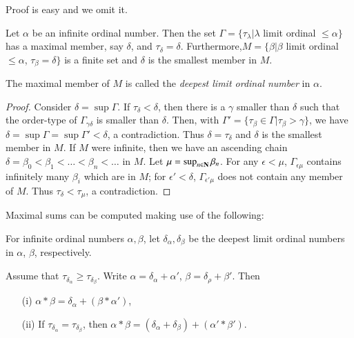 Proof is easy and we omit it.

\begin{thm}\label{art16-thm3.3}
Let $\alpha$ be an infinite ordinal number. Then the set $\Gamma =\{\tau_\lambda |\lambda$ limit ordinal $\leqslant \alpha\}$ has a maximal member, say $\delta$, and $\tau_\delta = \delta$. Furthermore,\pageoriginale $M = \{\beta | \beta$ limit ordinal $\leqslant \alpha$, $\tau_\beta = \delta\}$ is a finite set and $\delta$ is the smallest member in $M$.
\end{thm}

The maximal member of $M$ is called the {\em deepest limit ordinal number} in $\alpha$.

\begin{proof}
Consider $\delta = \sup \Gamma$. If $\tau_\delta < \delta$, then there is a $\gamma$ smaller than $\delta$ such that the order-type of $\Gamma_{\gamma\delta}$ is smaller than $\delta$. Then, with $\Gamma' = \{\tau_\beta \in \Gamma | \tau_\beta > \gamma\}$, we have $\delta = \sup \Gamma = \sup \Gamma' < \delta$, a contradiction. Thus $\delta = \tau_\delta$ and $\delta$ is the smallest member in $M$. If $M$ were infinite, then we have an ascending chain $\delta = \beta_0 < \beta_1 < \ldots < \beta_n < \ldots$ in $M$. Let  $\mu =\sup_{n \in \mathbf{N}} \beta_n$. For any $\epsilon < \mu$, $\Gamma_{\epsilon \mu}$ contains infinitely many $\beta_{i}$ which are in $M$; for $\epsilon' < \delta$, $\Gamma_{\epsilon'\mu}$ does not contain any member of $M$. Thus $\tau_\delta < \tau_\mu$, a contradiction.
\end{proof}

Maximal sums can be computed making use of the following:

\begin{thm}\label{art16-thm3.4}
For infinite ordinal numbers $\alpha, \beta$, let $\delta_\alpha, \delta_\beta$ be the deepest limit ordinal numbers in $\alpha$, $\beta$, respectively.
\end{thm}

Assume that $\tau_{\delta_\alpha} \geqslant \tau_{\delta_\beta}$. Write $\alpha = \delta_{\alpha} + \alpha'$, $\beta = \delta_\rho + \beta'$. Then
\begin{itemize}
\item[(i)] $\alpha * \beta = \delta_\alpha + (\beta * \alpha')$,

\item[(ii)] If $\tau_{\delta_\alpha} = \tau_{\delta_\beta}$, then $\alpha * \beta = (\delta_\alpha + \delta_\beta) +(\alpha'*\beta')$.
\end{itemize}

